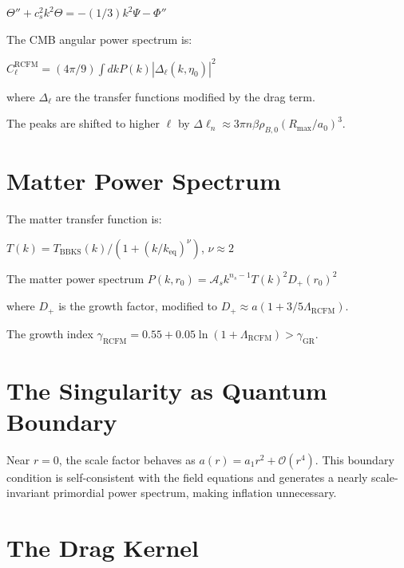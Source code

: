 \documentclass[10pt,twocolumn]{article}
\theoremstyle{definition}
\newcommand{\Rmax}{R_{\max}}
\begin{document}
\( \Theta'' + c_{s}^{2} k^{2} \Theta = - (1/3) k^{2} \Psi - \Phi'' \)

The CMB angular power spectrum is:

\( C_{\ell}^{\mathrm{RCFM}} = (4 \pi / 9) \int dk P(k) |\Delta_{\ell}(k, \eta_{0})|^{2} \)

where \( \Delta_{\ell} \) are the transfer functions modified by the drag term.

The peaks are shifted to higher \( \ell \) by \( \Delta \ell_{n} \approx 3 \pi n \beta \rho_{B,0} (\Rmax / a_{0})^{3} \).

\section{Matter Power Spectrum}
\label{sec:pk}

The matter transfer function is:

\( T(k) = T_{\mathrm{BBKS}}(k) / (1 + (k / k_{\mathrm{eq}})^{\nu}) \), \( \nu \approx 2 \) \citep{Bardeen1986}

The matter power spectrum \( P(k, r_{0}) = \mathcal{A}_{s} k^{n_{s}-1} T(k)^{2} D_{+}(r_{0})^{2} \)

where \( D_{+} \) is the growth factor, modified to \( D_{+} \approx a (1 + 3/5 \Lambda_{\mathrm{RCFM}}) \).

The growth index \( \gamma_{\mathrm{RCFM}} = 0.55 + 0.05 \ln(1 + \Lambda_{\mathrm{RCFM}}) > \gamma_{\mathrm{GR}} \).

\section{The Singularity as Quantum Boundary}
\label{sec:singularity}

Near \( r=0 \), the scale factor behaves as \( a(r) = a_{1} r^{2} + \mathcal{O}(r^{4}) \).  
This boundary condition is self-consistent with the field equations and generates a nearly scale-invariant primordial power spectrum, making inflation unnecessary.



\section{The Drag Kernel}
\label{sec:drag}
\end{document}
